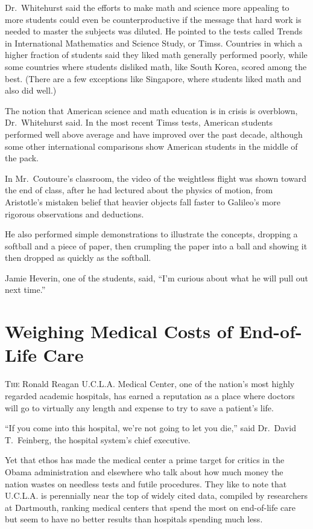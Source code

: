 ﻿\documentclass[12pt]{article}
\begin{document}
Dr.~Whitehurst said the efforts to make math and science more appealing to more students could even
be counterproductive if the message that hard work is needed to master the subjects was diluted. He
pointed to the tests called Trends in International Mathematics and Science Study, or Timss.
Countries in which a higher fraction of students said they liked math generally performed poorly,
while some countries where students disliked math, like South Korea, scored among the best. (There
are a few exceptions like Singapore, where students liked math and also did well.)

The notion that American science and math education is in crisis is overblown, Dr.~Whitehurst said.
In the most recent Timss tests, American students performed well above average and have improved
over the past decade, although some other international comparisons show American students in the
middle of the pack.

In Mr.~Coutoure's classroom, the video of the weightless flight was shown toward the end of class,
after he had lectured about the physics of motion, from Aristotle's mistaken belief that heavier
objects fall faster to Galileo's more rigorous observations and deductions.

He also performed simple demonstrations to illustrate the concepts, dropping a softball and a piece
of paper, then crumpling the paper into a ball and showing it then dropped as quickly as the
softball.

Jamie Heverin, one of the students, said, ``I'm curious about what he will pull out next time.''

\section{Weighing Medical Costs of End-of-Life Care}

\lettrine{T}{he} Ronald Reagan U.C.L.A. Medical Center, one of the nation's
most highly regarded academic hospitals, has earned a reputation as a place where doctors will go to
virtually any length and expense to try to save a patient's life.

``If you come into this hospital, we're not going to let you die,'' said Dr.~David T.~Feinberg, the
hospital system's chief executive.

Yet that ethos has made the medical center a prime target for critics in the Obama administration
and elsewhere who talk about how much money the nation wastes on needless tests and futile
procedures. They like to note that U.C.L.A. is perennially near the top of widely cited data,
compiled by researchers at Dartmouth, ranking medical centers that spend the most on end-of-life
care but seem to have no better results than hospitals spending much less.
\end{document}
